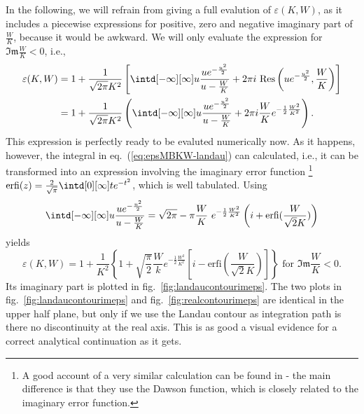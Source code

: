 \documentclass[physics,phd,nolot,nolof]{uccthesis}%
\begin{document}
In the following, we will refrain from giving a full evalution of $\varepsilon(K,W)$, as it includes a piecewise expressions for positive, zero and negative imaginary part of $\frac{W}{K}$, because it would be awkward. 
We will only evaluate the expression for $\mathfrak{Im}\frac{W}{K}<0$, i.e.,
\begin{equation}
	\begin{split}
	\varepsilon(K,W)
	&=1+\frac{1}{\sqrt{2\pi}K^2}\left[\intd[-\infty][\infty]u \frac{u e^{-\frac{u^2}{2}}}{u-\frac{W}{K}}
	+ 2\pi i~\text{Res}\left(u e^{-\frac{u^2}{2}},\frac{W}{K}\right)\right]\\
	&=1+\frac{1}{\sqrt{2\pi}K^2}\left(\intd[-\infty][\infty]u \frac{u e^{-\frac{u^2}{2}}}{u-\frac{W}{K}}
	+2\pi i\frac{W}{K} e^{-\frac{1}{2}\frac{W^2}{K^2}}\right).
	\end{split}
	\label{eq:epsMBKW-landau}
\end{equation}
This expression is perfectly ready to be evaluted numerically now. As it happens, however, the integral in eq.~(\ref{eq:epsMBKW-landau}) can calculated, i.e., it can be transformed into an expression involving the imaginary error function
\footnote{A good account of a very similar calculation can be found in \cite{bittencourtplasmafundamentals}- the main difference is that they use the Dawson function, which is closely related to the imaginary error function.}
$\text{erfi}(z)=\frac{2}{\sqrt{\pi}}\intd[0][\infty]t e^{-t^2}$, which is well tabulated.
Using
\begin{equation}
	\intd[-\infty][\infty]u \frac{u e^{-\frac{u^2}{2}}}{u-\frac{W}{K}}
	=\sqrt{2\pi}-\pi\frac{W}{K}~e^{-\frac{1}{2}\frac{W^2}{K^2}}\left(i+\text{erfi}(\frac{W}{\sqrt{2}K}) \right)
	\label{eq:erfiint}
\end{equation}
yields 
\begin{equation}
	\varepsilon(K,W)=
	1+\frac{1}{K^2}\left\{
	1+\sqrt{\frac{\pi}{2}}\frac{W}{k}e^{-\frac{1}{2}\frac{W^2}{K^2}}
	\left[i-\text{erfi}(\frac{W}{\sqrt{2}K})\right]
	\right\} \text{ for }\mathfrak{Im}\frac{W}{K}<0.
	\label{eq:epsMBfinal}
\end{equation}
Its imaginary part is plotted in fig.~\ref{fig:landaucontourimeps}. 
The two plots in fig.~\ref{fig:landaucontourimeps} and fig.~\ref{fig:realcontourimeps}
are identical in the upper half plane, but only if we use the Landau contour as integration path is there no discontinuity at the real axis. 
This is as good a visual evidence for a correct analytical continuation as it gets.
\end{document}
